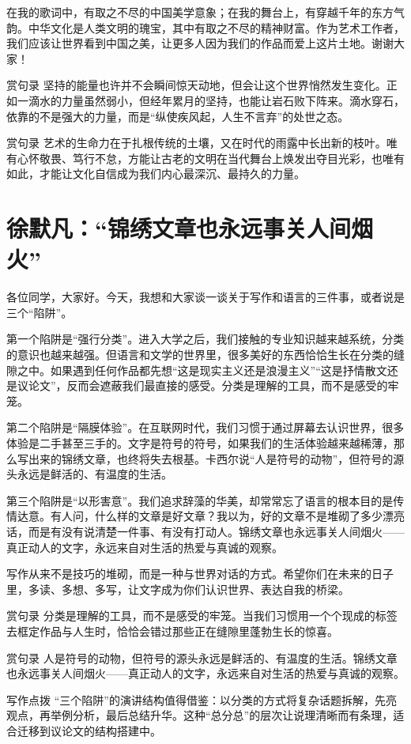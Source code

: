 在我的歌词中，有取之不尽的中国美学意象；在我的舞台上，有穿越千年的东方气韵。中华文化是人类文明的瑰宝，其中有取之不尽的精神财富。作为艺术工作者，我们应该让世界看到中国之美，让更多人因为我们的作品而爱上这片土地。谢谢大家！

\begin{quoteBox}{赏句录}
坚持的能量也许并不会瞬间惊天动地，但会让这个世界悄然发生变化。正如一滴水的力量虽然弱小，但经年累月的坚持，也能让岩石败下阵来。滴水穿石，依靠的不是强大的力量，而是“纵使疾风起，人生不言弃”的处世之态。
\end{quoteBox}

\begin{quoteBox}{赏句录}
艺术的生命力在于扎根传统的土壤，又在时代的雨露中长出新的枝叶。唯有心怀敬畏、笃行不怠，方能让古老的文明在当代舞台上焕发出夺目光彩，也唯有如此，才能让文化自信成为我们内心最深沉、最持久的力量。
\end{quoteBox}

\clearpage
\section*{徐默凡：“锦绣文章也永远事关人间烟火”}


各位同学，大家好。今天，我想和大家谈一谈关于写作和语言的三件事，或者说是三个“陷阱”。

第一个陷阱是“强行分类”。进入大学之后，我们接触的专业知识越来越系统，分类的意识也越来越强。但语言和文学的世界里，很多美好的东西恰恰生长在分类的缝隙之中。如果遇到任何作品都先想“这是现实主义还是浪漫主义”“这是抒情散文还是议论文”，反而会遮蔽我们最直接的感受。分类是理解的工具，而不是感受的牢笼。

第二个陷阱是“隔膜体验”。在互联网时代，我们习惯于通过屏幕去认识世界，很多体验是二手甚至三手的。文字是符号的符号，如果我们的生活体验越来越稀薄，那么写出来的锦绣文章，也终将失去根基。卡西尔说“人是符号的动物”，但符号的源头永远是鲜活的、有温度的生活。

第三个陷阱是“以形害意”。我们追求辞藻的华美，却常常忘了语言的根本目的是传情达意。有人问，什么样的文章是好文章？我以为，好的文章不是堆砌了多少漂亮话，而是有没有说清楚一件事、有没有打动人。锦绣文章也永远事关人间烟火——真正动人的文字，永远来自对生活的热爱与真诚的观察。

写作从来不是技巧的堆砌，而是一种与世界对话的方式。希望你们在未来的日子里，多读、多想、多写，让文字成为你们认识世界、表达自我的桥梁。

\begin{quoteBox}{赏句录}
分类是理解的工具，而不是感受的牢笼。当我们习惯用一个个现成的标签去框定作品与人生时，恰恰会错过那些正在缝隙里蓬勃生长的惊喜。
\end{quoteBox}

\begin{quoteBox}{赏句录}
人是符号的动物，但符号的源头永远是鲜活的、有温度的生活。锦绣文章也永远事关人间烟火——真正动人的文字，永远来自对生活的热爱与真诚的观察。
\end{quoteBox}

\begin{quoteBox}{写作点拨}
“三个陷阱”的演讲结构值得借鉴：以分类的方式将复杂话题拆解，先亮观点，再举例分析，最后总结升华。这种“总分总”的层次让说理清晰而有条理，适合迁移到议论文的结构搭建中。
\end{quoteBox}
